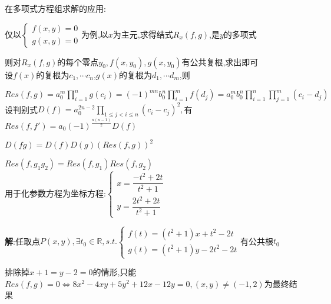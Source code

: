 在多项式方程组求解的应用:

仅以$ \begin{cases}f(x,y)=0 \\g(x,y)=0 \end{cases}$为例,以$ x$为主元,求得结式$ R_x(f,g)$,是$ y$的多项式

则对$ R_x(f,g)$的每个零点$ y_0,f(x,y_0),g(x,y_0)$有公共复根,求出即可
\\

设$ f(x)$的复根为$c_1,\cdots c_n $,$ g(x)$的复根为$ d_1,\cdots d_m$,则

$ Res(f,g)=a_0^m\prod_{i=1}^{n}{g(c_i)}=(-1)^{mn}b_0^n\prod_{i=1}^{m}{f(d_j)}=a_0^mb_0^n\prod_{i=1}^{n}\prod_{j=1}^{m}{(c_i-d_j)}$
\\

设判别式$ D(f)=a_0^{2n-2}\prod_{1\le j<i\le n}{(c_i-c_j)^2},$有$ Res(f,f')=a_0(-1)^{\frac{n(n-1)}{2}}D(f)$

$ D(fg)=D(f)D(g)(Res(f,g))^2$

$ Res(f,g_1g_2)=Res(f,g_1)Res(f,g_2)$
\\

用于化参数方程为坐标方程:$ \begin{cases}x=\dfrac{-t^2+2t}{t^2+1} \\ y=\dfrac{2t^2+2t}{t^2+1} \end{cases}$

{\bf 解}:任取点$ P(x,y),\exists t_0 \in \mathbb{R},s.t.\begin{cases}f(t)=(t^2+1)x+t^2-2t \\ g(t)=(t^2+1)y-2t^2-2t \end{cases}$有公共根$ t_0$

排除掉$ x+1=y-2=0$的情形,只能$ Res(f,g)=0\Leftrightarrow 8x^2-4xy+5y^2+12x-12y=0 ,(x,y) \ne (-1,2)$为最终结果
